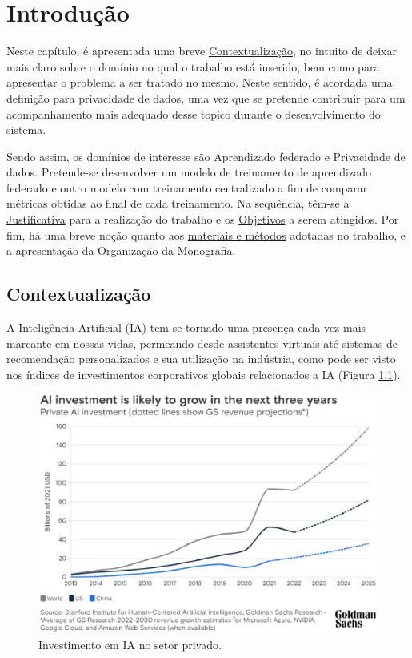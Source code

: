 \chapter[Introdução]{Introdução}
\label{chap:introducao}

Neste capítulo, é apresentada uma breve \hyperref[sec:contextualizacao]{Contextualização}, no intuito de deixar mais claro sobre o domínio no qual o trabalho está inserido, bem como para apresentar o problema a ser tratado no mesmo. Neste sentido, é acordada uma definição para privacidade de dados, uma vez que se pretende contribuir para um acompanhamento mais adequado desse topico durante o desenvolvimento do sistema. 

Sendo assim, os domínios de interesse são Aprendizado federado e Privacidade de dados. Pretende-se desenvolver um modelo de treinamento de aprendizado federado e outro modelo com treinamento centralizado a fim de comparar métricas obtidas ao final de cada treinamento. Na sequência, têm-se a \hyperref[sec:justificativa]{Justificativa} para a realização do trabalho e os \hyperref[sec:objetivos]{Objetivos} a serem atingidos. Por fim, há uma breve noção quanto aos \hyperref[sec:metodologia]{materiais e métodos} adotadas no trabalho, e a apresentação da \hyperref[sec:organizacao]{Organização da Monografia}.

\section{Contextualização}
\label{sec:contextualizacao}

A Inteligência Artificial (IA) tem se tornado uma presença cada vez mais marcante em nossas vidas, permeando desde assistentes virtuais até sistemas de recomendação personalizados e sua utilização na indústria, como pode ser visto nos índices de investimentos corporativos globais relacionados a IA (Figura \ref{fig:investimentoIA}).

\begin{figure}[h]
    \centering
    \includegraphics[scale=0.6]{figuras/introducao/AIInvestiments2025.eps}
    \caption{Investimento em IA no setor privado.}
    \label{fig:investimentoIA}
\end{figure}

